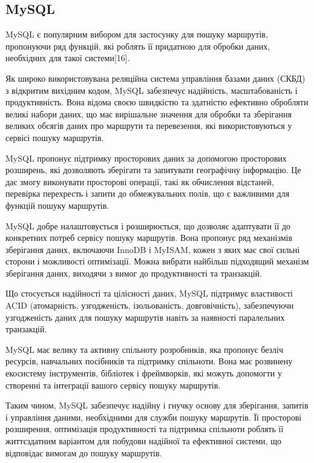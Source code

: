 \subsection{MySQL}
\label{subsec:mysql-subsection}

MySQL є популярним вибором для застосунку для пошуку маршрутів, пропонуючи ряд функцій, які роблять її придатною для обробки даних, необхідних для такої системи[16].

Як широко використовувана реляційна система управління базами даних (СКБД) з відкритим вихідним кодом, MySQL забезпечує надійність, масштабованість і продуктивність. Вона відома своєю швидкістю та здатністю ефективно обробляти великі набори даних, що має вирішальне значення для обробки та зберігання великих обсягів даних про маршрути та перевезення, які використовуються у сервісі пошуку маршрутів.

MySQL пропонує підтримку просторових даних за допомогою просторових розширень, які дозволяють зберігати та запитувати географічну інформацію. Це дає змогу виконувати просторові операції, такі як обчислення відстаней, перевірка перехресть і запити до обмежувальних полів, що є важливими для функцій пошуку маршрутів.

MySQL добре налаштовується і розширюється, що дозволяє адаптувати її до конкретних потреб сервісу пошуку маршрутів. Вона пропонує ряд механізмів зберігання даних, включаючи InnoDB і MyISAM, кожен з яких має свої сильні сторони і можливості оптимізації. Можна вибрати найбільш підходящий механізм зберігання даних, виходячи з вимог до продуктивності та транзакцій.

Що стосується надійності та цілісності даних, MySQL підтримує властивості ACID (атомарність, узгодженість, ізольованість, довговічність), забезпечуючи узгодженість даних для пошуку маршрутів навіть за наявності паралельних транзакцій.

MySQL має велику та активну спільноту розробників, яка пропонує безліч ресурсів, навчальних посібників та підтримку спільноти. Вона має розвинену екосистему інструментів, бібліотек і фреймворків, які можуть допомогти у створенні та інтеграції вашого сервісу пошуку маршрутів.

Таким чином, MySQL забезпечує надійну і гнучку основу для зберігання, запитів і управління даними, необхідними для служби пошуку маршрутів. Її просторові розширення, оптимізація продуктивності та підтримка спільноти роблять її життєздатним варіантом для побудови надійної та ефективної системи, що відповідає вимогам до пошуку маршрутів.